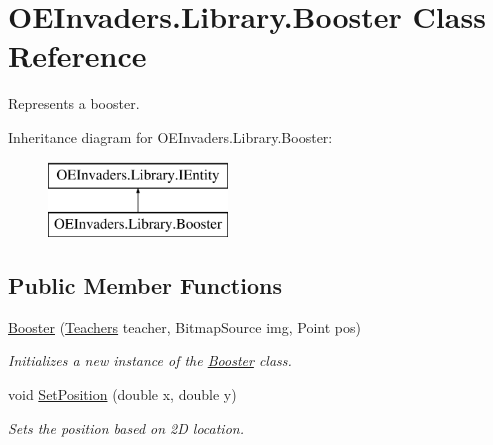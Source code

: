\hypertarget{class_o_e_invaders_1_1_library_1_1_booster}{}\section{O\+E\+Invaders.\+Library.\+Booster Class Reference}
\label{class_o_e_invaders_1_1_library_1_1_booster}


Represents a booster.  


Inheritance diagram for O\+E\+Invaders.\+Library.\+Booster\+:\begin{figure}[H]
\begin{center}
\leavevmode
\includegraphics[height=2.000000cm]{class_o_e_invaders_1_1_library_1_1_booster}
\end{center}
\end{figure}
\subsection*{Public Member Functions}
\begin{DoxyCompactItemize}
\item 
\mbox{\hyperlink{class_o_e_invaders_1_1_library_1_1_booster_ab15ca68210050b866d160cea8e0ebe10}{Booster}} (\mbox{\hyperlink{namespace_o_e_invaders_1_1_library_ad26529e6e309f95c10efa56a99f0b80e}{Teachers}} teacher, Bitmap\+Source img, Point pos)
\begin{DoxyCompactList}\small\item\em Initializes a new instance of the \mbox{\hyperlink{class_o_e_invaders_1_1_library_1_1_booster}{Booster}} class. \end{DoxyCompactList}\item 
void \mbox{\hyperlink{class_o_e_invaders_1_1_library_1_1_booster_a8e4432729479a933b398e0dbdb8f75f7}{Set\+Position}} (double x, double y)
\begin{DoxyCompactList}\small\item\em Sets the position based on 2D location. \end{DoxyCompactList}\end{DoxyCompactItemize}
